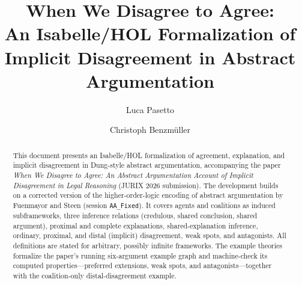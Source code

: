 \documentclass[11pt,a4paper]{article}
\begin{document}
\title{When We Disagree to Agree:\\
  An Isabelle/HOL Formalization of Implicit Disagreement
  in Abstract Argumentation}
\author{Luca Pasetto \and Christoph Benzm\"uller}
\maketitle

\begin{abstract}
  This document presents an Isabelle/HOL formalization of agreement,
  explanation, and implicit disagreement in Dung-style abstract
  argumentation, accompanying the paper \emph{When We Disagree to Agree: An
  Abstract Argumentation Account of Implicit Disagreement in Legal
  Reasoning} (JURIX 2026 submission). The development builds on a corrected
  version of the higher-order-logic encoding of abstract argumentation by
  Fuenmayor and Steen (session \texttt{AA\_Fixed}). It covers agents and
  coalitions as induced subframeworks, three inference relations (credulous,
  shared conclusion, shared argument), proximal and complete explanations,
  shared-explanation inference, ordinary, proximal, and distal (implicit)
  disagreement, weak spots, and antagonists. All definitions are stated for
  arbitrary, possibly infinite frameworks. The example theories formalize the
  paper's running six-argument example graph and machine-check its computed
  properties---preferred extensions, weak spots, and antagonists---together
  with the coalition-only distal-disagreement example.
\end{abstract}

\tableofcontents

\newpage


\end{document}
